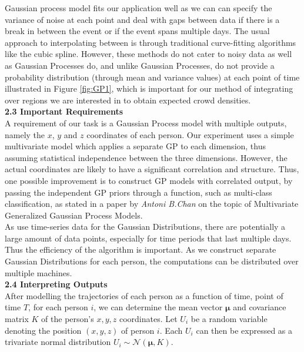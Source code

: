 \documentclass[letterpaper]{article}
\begin{document}
Gaussian process model fits our application well as we can can specify the variance of noise at each point and deal with gaps between data if there is a break in between the event or if the event spans multiple days. The usual approach to interpolating between is through traditional curve-fitting algorithms like the cubic spline. However, these methods do not cater to noisy data as well as Gaussian Processes do, and unlike Gaussian Processes, do not provide a probability distribution (through mean and variance values) at each point of time illustrated in Figure \ref{fig:GP1}, which is important for our method of integrating over regions we are interested in to obtain expected crowd densities.\\


{\bf2.3  Important Requirements} \\

A requirement of our task is a Gaussian Process model with multiple outputs, namely the $x$, $y$ and $z$ coordinates of each person. Our experiment uses a simple multivariate model which applies a separate GP to each dimension, thus assuming statistical independence between the three dimensions. However, the actual coordinates are likely to have a significant correlation and structure. Thus, one possible improvement is to construct GP models with correlated output, by passing the independent GP priors through a function, such as multi-class classification, as stated in a paper by {\it Antoni B.Chan} on the topic of Multivariate Generalized Gaussian Process Models. \\
As use time-series data for the Gaussian Distributions, there are potentially a large amount of data points, especially for time periods that last multiple days. Thus the efficiency of the algorithm is important. As we construct separate Gaussian Distributions for each person, the computations can be distributed over multiple machines.\\

{\bf2.4  Interpreting Outputs} \\

After modelling the trajectories of each person as a function of time, point of time $T$, for each person $i$, we can determine the mean vector $\boldsymbol{\mu}$ and covariance matrix $K$ of the person's $x,y,z$ coordinates. Let $U_i$ be a random variable denoting the position $(x,y,z)$ of person $i$. Each $U_i$ can then be expressed as a trivariate normal distribution $U_i \sim \mathcal{N}(\boldsymbol{\mu},K)$.\\
\end{document}

